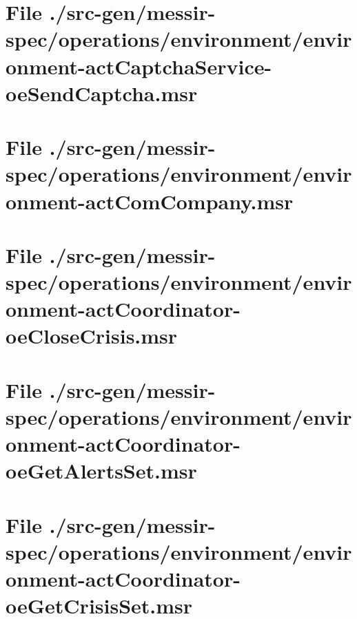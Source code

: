 \section[File /src-gen/messir-spec.../environment-actCaptchaService-oeSendCaptcha.msr]{File ./src-gen/messir-spec/operations/environment/environment-actCaptchaService-oeSendCaptcha.msr}
\scriptsize

\normalsize
	
\section[File /src-gen/messir-spec/operations/environment/environment-actComCompany.msr]{File ./src-gen/messir-spec/operations/environment/environment-actComCompany.msr}
\scriptsize

\normalsize
	
\section[File /src-gen/messir-spec.../environment-actCoordinator-oeCloseCrisis.msr]{File ./src-gen/messir-spec/operations/environment/environment-actCoordinator-oeCloseCrisis.msr}
\scriptsize

\normalsize
	
\section[File /src-gen/messir-spec.../environment-actCoordinator-oeGetAlertsSet.msr]{File ./src-gen/messir-spec/operations/environment/environment-actCoordinator-oeGetAlertsSet.msr}
\scriptsize

\normalsize
	
\section[File /src-gen/messir-spec.../environment-actCoordinator-oeGetCrisisSet.msr]{File ./src-gen/messir-spec/operations/environment/environment-actCoordinator-oeGetCrisisSet.msr}
\scriptsize

\normalsize
	
